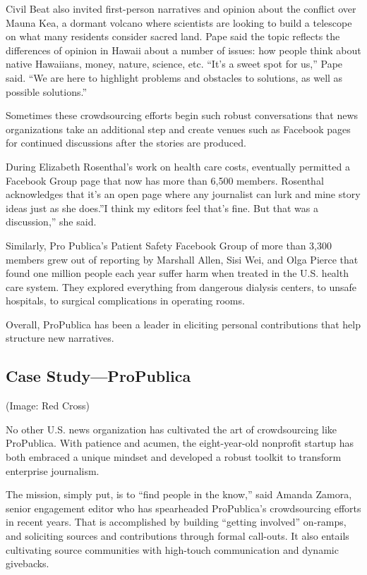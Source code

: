 \begin{itemize}
\begin{itemize}
\begin{enumerate}
{Civil Beat also invited first-person narratives and opinion about the conflict over Mauna Kea, a dormant volcano where scientists are looking to build a telescope on what many residents consider sacred land. Pape said the topic reflects the differences of opinion in Hawaii about a number of issues: how people think about native Hawaiians, money, nature, science, etc. “It’s a sweet spot for us,” Pape said. “We are here to highlight problems and obstacles to solutions, as well as possible solutions.”\autocite{Pape}

Sometimes these crowdsourcing efforts begin such robust conversations that news organizations take an additional step and create venues such as Facebook pages for continued discussions after the stories are produced.

During Elizabeth Rosenthal’s work on health care costs,  eventually permitted a Facebook Group page that now has more than 6,500 members. Rosenthal acknowledges that it’s an open page where any journalist can lurk and mine story ideas just as she does.''I think my editors feel that’s fine. But that was a discussion,'' she said.\autocite{Rosenthal}

Similarly, Pro Publica’s Patient Safety Facebook Group of more than 3,300 members\autocite{Group} grew out of reporting by Marshall Allen, Sisi Wei, and Olga Pierce that found one million people each year suffer harm when treated in the U.S. health care system.\autocite{Safety} They explored everything from dangerous dialysis centers, to unsafe hospitals, to surgical complications in operating rooms. 

Overall, ProPublica has been a leader in eliciting personal contributions that help structure new narratives.

\subsection{Case Study---ProPublica} (Image: Red Cross)
 
No other U.S. news organization has cultivated the art of crowdsourcing like ProPublica. With patience and acumen, the eight-year-old nonprofit startup has both embraced a unique mindset and developed a robust toolkit to transform enterprise journalism.

The mission, simply put, is to “find people in the know,” said Amanda Zamora, senior engagement editor who has spearheaded ProPublica’s crowdsourcing efforts in recent years. That is accomplished by building “getting involved” on-ramps, and soliciting sources and contributions through formal call-outs. It also entails cultivating source communities with high-touch communication and dynamic givebacks.

}
\end{enumerate}
\end{itemize}
\end{itemize}
